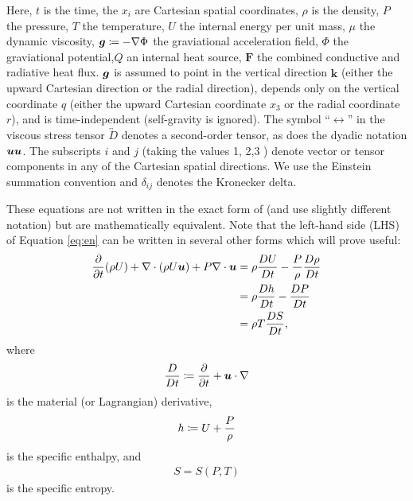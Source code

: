 \documentclass[12pt]{article}
\newcommand{\vecf}{\bm{F}}
\newcommand{\veck}{\hat{\bm{k}}}
\begin{document}
	Here, $t$ is the time, the $x_i$ are Cartesian spatial coordinates, $\rho$ is the density, $P$ the pressure, $T$ the temperature, $U$ the internal energy per unit mass, $\mu$ the dynamic viscosity, $\bm{g}\coloneqq -\nabla\Phi$ the graviational acceleration field, $\Phi$ the graviational potential,$Q$ an internal heat source, $\vecf$ the combined conductive and radiative heat flux. $\bm{g}$ is assumed to point in the vertical direction $\veck$ (either the upward Cartesian direction or the radial direction), depends only on the vertical coordinate $q$ (either the upward Cartesian coordinate $x_3$ or the radial coordinate $r$), and is time-independent (self-gravity is ignored). The symbol ``$\leftrightarrow$'' in the viscous stress tensor $\overleftrightarrow{D}$ denotes a second-order tensor, as does the dyadic notation $\bm{u}\bm{u}$. The subscripts $i$ and $j$ (taking the values 1, 2,3 ) denote vector or tensor components in any of the Cartesian spatial directions.  We use the Einstein summation convention and $\delta_{ij}$ denotes the Kronecker delta. 
	
	These equations are not written in the exact form of \citet{Gough1969} (and use slightly different notation) but are mathematically equivalent. Note that the left-hand side (LHS) of Equation \eqref{eq:en} can be written in several other forms which will prove useful: 
	\begin{subequations}\label{eq:enlhs}
	\begin{align}
		\frac{\partial}{\partial t}(\rho U) + \nabla\cdot(\rho U\bm{u}) + P\nabla\cdot\bm{u} &= \rho\frac{DU}{Dt} - \frac{P}{\rho}\frac{D\rho}{Dt}\\
		&= \rho\frac{Dh}{Dt} -\frac{DP}{Dt}\\
		&=\rho T \frac{DS}{Dt},
	\end{align}
	\end{subequations}
	where 
	\begin{align}\label{eq:matderiv}
		\frac{D}{Dt}{}\coloneqq \frac{\partial}{\partial t} + \bm{u}\cdot\nabla
	\end{align}
	is the material (or Lagrangian) derivative,
	\begin{align}\label{eq:enthalpy}
		h\coloneqq U + \frac{P}{\rho}
	\end{align}
	is the specific enthalpy, and
	\begin{align}\label{eq:entropy}
		S = S(P,T)
	\end{align}
	is the specific entropy. 
	
\end{document}
